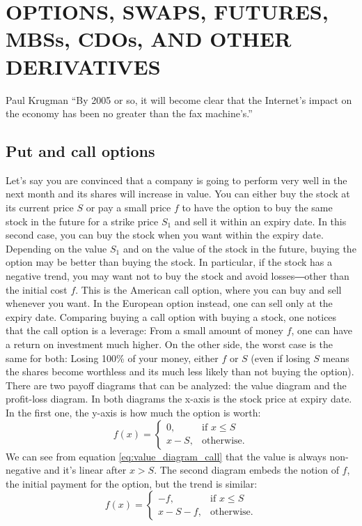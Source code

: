 \chapter{OPTIONS, SWAPS, FUTURES, MBSs, CDOs, AND OTHER DERIVATIVES}
\begin{chapquote}{Paul Krugman}
``By 2005 or so, it will become clear that the Internet’s impact on the economy has been no greater than the fax machine’s.''
\end{chapquote}

\section{Put and call options}
Let's say you are convinced that a company is going to perform very well in the next month and its shares will increase in value. You can either buy the stock at its current price $S$ or pay a small price $f$ to have the option to buy the same stock in the future for a strike price $S_1$ and sell it within an expiry date. In this second case, you can buy the stock when you want within the expiry date. Depending on the value $S_1$ and on the value of the stock in the future, buying the option may be better than buying the stock. In particular, if the stock has a negative trend, you may want not to buy the stock and avoid losses―other than the initial cost $f$. This is the American call option, where you can buy and sell whenever you want. In the European option instead, one can sell only at the expiry date. Comparing buying a call option with buying a stock, one notices that the call option is a leverage: From a small amount of money $f$, one can have a return on investment much higher. On the other side, the worst case is the same for both: Losing 100\% of your money, either $f$ or $S$ (even if losing $S$ means the shares become worthless and its much less likely than not buying the option).
There are two payoff diagrams that can be analyzed: the value diagram and the profit-loss diagram. In both diagrams the x-axis is the stock price at expiry date. In the first one, the y-axis is how much the option is worth:
\begin{equation}\label{eq:value_diagram_call}
            f(x) = 
    \begin{cases}
        0,                  & \text{if } x\leq S\\
        x - S,              & \text{otherwise.}
    \end{cases}
\end{equation}
We can see from equation \ref{eq:value_diagram_call} that the value is always non-negative and it's linear after $x > S$.
The second diagram embeds the notion of $f$, the initial payment for the option, but the trend is similar:
\begin{equation}\label{eq:PL_diagram_call}
            f(x) = 
    \begin{cases}
        -f,                     & \text{if } x\leq S\\
        x - S - f,              & \text{otherwise.}
    \end{cases}
\end{equation}

